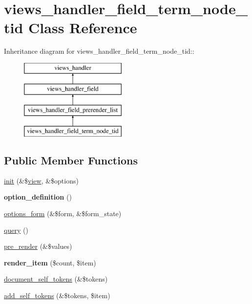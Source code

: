\hypertarget{classviews__handler__field__term__node__tid}{
\section{views\_\-handler\_\-field\_\-term\_\-node\_\-tid Class Reference}
\label{classviews__handler__field__term__node__tid}
}
Inheritance diagram for views\_\-handler\_\-field\_\-term\_\-node\_\-tid::\begin{figure}[H]
\begin{center}
\leavevmode
\includegraphics[height=4cm]{classviews__handler__field__term__node__tid}
\end{center}
\end{figure}
\subsection*{Public Member Functions}
\begin{DoxyCompactItemize}
\item 
\hyperlink{classviews__handler__field__term__node__tid_ac3c22862ed731d0fc71d56ba9308d120}{init} (\&\$\hyperlink{classview}{view}, \&\$options)
\item 
\hypertarget{classviews__handler__field__term__node__tid_a6c6e6369b1897f4f6643a609b1a802a5}{
{\bfseries option\_\-definition} ()}
\label{classviews__handler__field__term__node__tid_a6c6e6369b1897f4f6643a609b1a802a5}

\item 
\hyperlink{classviews__handler__field__term__node__tid_a0f0641c036e0a2498abd497cba1161a5}{options\_\-form} (\&\$form, \&\$form\_\-state)
\item 
\hyperlink{classviews__handler__field__term__node__tid_a8160a16d41604b141768dc313b6223b9}{query} ()
\item 
\hyperlink{classviews__handler__field__term__node__tid_a7e144b3fe39c483eea722484b87ff950}{pre\_\-render} (\&\$values)
\item 
\hypertarget{classviews__handler__field__term__node__tid_af5d54ae4ba053a0a5cccafc979f14b31}{
{\bfseries render\_\-item} (\$count, \$item)}
\label{classviews__handler__field__term__node__tid_af5d54ae4ba053a0a5cccafc979f14b31}

\item 
\hyperlink{classviews__handler__field__term__node__tid_afa909e51eb90573d468deb29a3943d94}{document\_\-self\_\-tokens} (\&\$tokens)
\item 
\hyperlink{classviews__handler__field__term__node__tid_a7fea3443ab075e3e35212ddc3b0d95f3}{add\_\-self\_\-tokens} (\&\$tokens, \$item)
\end{DoxyCompactItemize}


